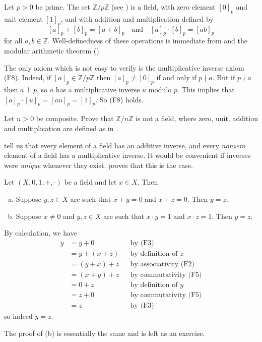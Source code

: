 \begin{example}
\label{exZpZIsField}
Let $p>0$ be prime. The set $\mathbb{Z}/p\mathbb{Z}$ (see ) is a field, with zero element $[0]_p$ and unit element $[1]_p$, and with addition and multiplication defined by
\[ [a]_p+[b]_p=[a+b]_p \quad \text{and} \quad [a]_p \cdot [b]_p = [ab]_p \]
for all $a,b \in \mathbb{Z}$. Well-definedness of these operations is immediate from  and the modular arithmetic theorem ().

The only axiom which is not easy to verify is the multiplicative inverse axiom (F8). Indeed, if $[a]_p \in \mathbb{Z}/p\mathbb{Z}$ then $[a]_p \ne [0]_p$ if and only if $p \nmid a$. But if $p \nmid a$ then $a \perp p$, so $a$ has a multiplicative inverse $u$ modulo $p$. This implies that $[a]_p \cdot [u]_p = [au]_p = [1]_p$. So (F8) holds.
\end{example}

\begin{exercise}
Let $n > 0$ be composite. Prove that $\mathbb{Z}/n\mathbb{Z}$ is not a field, where zero, unit, addition and multiplication are defined as in .
\end{exercise}

 tell us that every element of a field has an additive inverse, and every \textit{nonzero} element of a field has a multiplicative inverse. It would be convenient if inverses were \textit{unique} whenever they exist.  proves that this is the case.

\begin{proposition}
\label{propInversesInFieldsAreUnique}
Let $(X,0,1,+,{\cdot})$ be a field and let $x \in X$. Then
\begin{enumerate}[(a)]
\item Suppose $y,z \in X$ are such that $x+y=0$ and $x+z=0$. Then $y=z$.
\item Suppose $x \ne 0$ and $y,z \in X$ are such that $x \cdot y = 1$ and $x \cdot z = 1$. Then $y=z$.
\end{enumerate}
\end{proposition}
\begin{cproof}[of (a)]
By calculation, we have
\begin{align*}
y &= y + 0 && \text{by (F3)} \\
&= y + (x+z) && \text{by definition of $z$} \\
&= (y+x)+z && \text{by associativity (F2)} \\
&= (x+y)+z && \text{by commutativity (F5)} \\
&= 0+z && \text{by definition of $y$} \\
&= z+0 && \text{by commutativity (F5)} \\
&= z && \text{by (F3)}
\end{align*}
so indeed $y=z$.

The proof of (b) is essentially the same and is left as an exercise.
\end{cproof}

